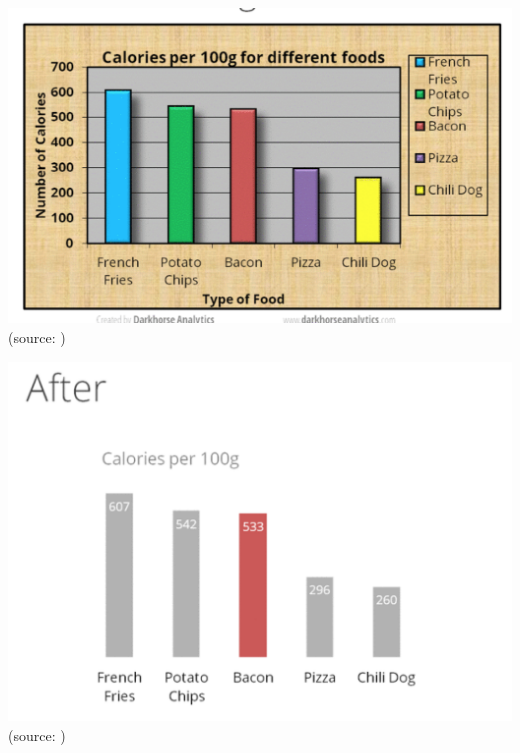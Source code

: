\documentclass[]{book}
\theoremstyle{definition}
\theoremstyle{definition}
\theoremstyle{definition}
\theoremstyle{remark}
\begin{document}
\includegraphics{images/Tufte_figure2.png} (source: \citep{appli_2017})

\includegraphics{images/Tufte_figure3.png} (source: \citep{appli_2017})
\end{document}
